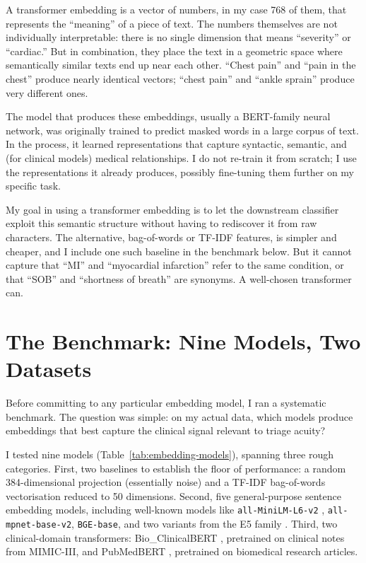 \begin{notebox}
A transformer embedding is a vector of numbers, in my case 768 of them, that represents the ``meaning'' of a piece of text. The numbers themselves are not individually interpretable: there is no single dimension that means ``severity'' or ``cardiac.'' But in combination, they place the text in a geometric space where semantically similar texts end up near each other. ``Chest pain'' and ``pain in the chest'' produce nearly identical vectors; ``chest pain'' and ``ankle sprain'' produce very different ones.

The model that produces these embeddings, usually a BERT-family neural network, was originally trained to predict masked words in a large corpus of text. In the process, it learned representations that capture syntactic, semantic, and (for clinical models) medical relationships. I do not re-train it from scratch; I use the representations it already produces, possibly fine-tuning them further on my specific task.
\end{notebox}

My goal in using a transformer embedding is to let the downstream classifier exploit this semantic structure without having to rediscover it from raw characters. The alternative, bag-of-words or TF-IDF features, is simpler and cheaper, and I include one such baseline in the benchmark below. But it cannot capture that ``MI'' and ``myocardial infarction'' refer to the same condition, or that ``SOB'' and ``shortness of breath'' are synonyms. A well-chosen transformer can.

\section{The Benchmark: Nine Models, Two Datasets}

Before committing to any particular embedding model, I ran a systematic benchmark. The question was simple: on my actual data, which models produce embeddings that best capture the clinical signal relevant to triage acuity?

I tested nine models (Table~\ref{tab:embedding-models}), spanning three rough categories. First, two baselines to establish the floor of performance: a random 384-dimensional projection (essentially noise) and a TF-IDF bag-of-words vectorisation reduced to 50 dimensions. Second, five general-purpose sentence embedding models, including well-known models like \texttt{all-MiniLM-L6-v2} \citep{reimers2019sentence}, \texttt{all-mpnet-base-v2}, \texttt{BGE-base}, and two variants from the E5 family \citep{wang2022e5}. Third, two clinical-domain transformers: Bio\_ClinicalBERT \citep{alsentzer2019clinicalbert}, pretrained on clinical notes from MIMIC-III, and PubMedBERT \citep{gu2021pubmedbert}, pretrained on biomedical research articles.

